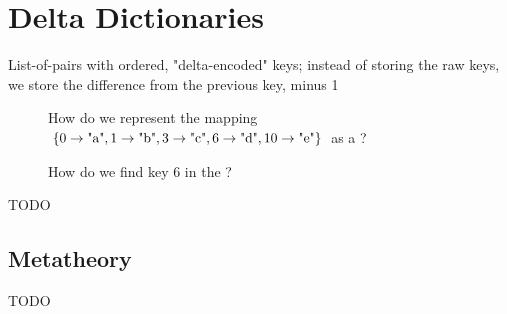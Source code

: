 \section{Delta Dictionaries}
\label{sec:DD}
List-of-pairs with ordered, "delta-encoded" keys;
instead of storing the raw keys, we store
the difference from the previous key, minus 1
\begin{figure}[H]
  \centering
  \caption{How do we represent the mapping $\{0 \rightarrow \text{"a"}, 1 \rightarrow \text{"b"}, 3 \rightarrow \text{"c"}, 6 \rightarrow \text{"d"}, 10 \rightarrow \text{"e"}\}$ as a \dd?}
  \label{fig:mech1}
\end{figure}
\begin{figure}[H]
  \centering
  \caption{How do we find key $6$ in the \dd?}
  \label{fig:find-6}
\end{figure}

TODO

\subsection{Metatheory}
\label{sec:Metatheory}
TODO

